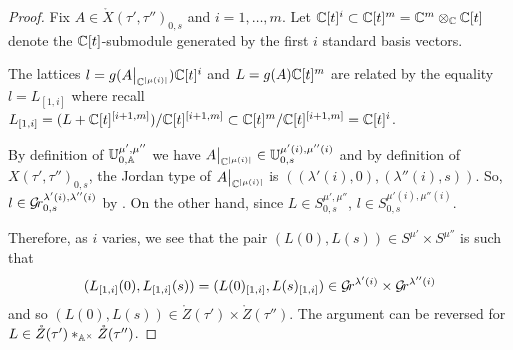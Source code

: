 \documentclass{article} %
\begin{document}
\begin{proof}
% 
Fix $A\in \mathring X(\tau',\tau'')_{0,s} $ and $i = 1,\dots, m$. 
% 
Let $\mathbb C[t]^i\subset\mathbb C[t]^m = \mathbb C^m\otimes_\mathbb C\mathbb C[t]$ denote the $\mathbb C[t]$-submodule generated by the first $i$ standard basis vectors.

The lattices $l=g(A\big|_{\mathbb C^{|\mu(i)|}})\mathbb C[t]^i$ and $L=g(A)\mathbb C[t]^m$ are related by the equality $ l = L_{[1,i]}$ where recall $L_{[1,i]} = (L + \mathbb C[t]^{[i+1,m]}) / \mathbb C[t]^{[i+1,m]}\subset \mathbb C[t]^m/\mathbb C[t]^{[i+1,m]} = \mathbb C[t]^i$. 
    
By definition of $\mathbb U^{\mu',\mu''}_{0,\mathbb A}$ we have $A\big|_{\mathbb C^{|\mu(i)|}}\in\mathbb U^{\mu'(i),\mu''(i)}_{0,s}$ and by definition of $X(\tau',\tau'')_{0,s}$, the Jordan type of $A\big|_{\mathbb C^{|\mu(i)|}}$ is $((\lambda'(i),0),(\lambda''(i),s))$. So, $l \in\mathcal{G}\!r_{0,s}^{\lambda'(i),\lambda''(i)}$ by . 
On the other hand, 
since $L\in S^{\mu',\mu''}_{0,s}$, $l\in S^{\mu'(i),\mu''(i)}_{0,s}$. 

Therefore, as $i$ varies, we see that the pair $(L(0),L(s))\in S^{\mu'}\times S^{\mu''}$ is such that 
$$(L_{[1,i]}(0),L_{[1,i]}(s))  = (L(0)_{[1,i]},L(s)_{[1,i]}) \in \mathcal{G}\!r^{\lambda'(i)}\times\mathcal{G}\!r^{\lambda''(i)}$$ 
and so $(L(0),L(s))\in \mathring Z(\tau')\times \mathring Z(\tau'')$. The argument can be reversed for
$L\in\mathring Z(\tau')\ast_{\mathbb A^\times} \mathring Z(\tau'')$.
% 
\end{proof}
% 
\end{document}
